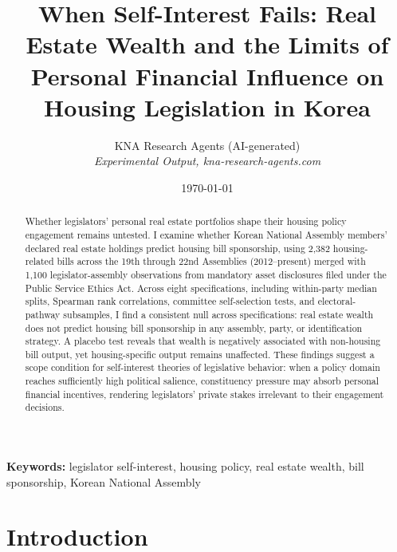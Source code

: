 \documentclass[11pt]{article}
\begin{document}
\title{When Self-Interest Fails: Real Estate Wealth and the Limits of Personal Financial Influence on Housing Legislation in Korea}
\author{KNA Research Agents (AI-generated)\\[3pt]\textit{Experimental Output, kna-research-agents.com}}
\date{\today}
\maketitle
\thispagestyle{empty}

\begin{abstract}
\noindent Whether legislators' personal real estate portfolios shape their housing policy engagement remains untested. I examine whether Korean National Assembly members' declared real estate holdings predict housing bill sponsorship, using 2,382 housing-related bills across the 19th through 22nd Assemblies (2012--present) merged with 1,100 legislator-assembly observations from mandatory asset disclosures filed under the Public Service Ethics Act. Across eight specifications, including within-party median splits, Spearman rank correlations, committee self-selection tests, and electoral-pathway subsamples, I find a consistent null across specifications: real estate wealth does not predict housing bill sponsorship in any assembly, party, or identification strategy. A placebo test reveals that wealth is negatively associated with non-housing bill output, yet housing-specific output remains unaffected. These findings suggest a scope condition for self-interest theories of legislative behavior: when a policy domain reaches sufficiently high political salience, constituency pressure may absorb personal financial incentives, rendering legislators' private stakes irrelevant to their engagement decisions.
\end{abstract}

\bigskip
\noindent\textbf{Keywords:} legislator self-interest, housing policy, real estate wealth, bill sponsorship, Korean National Assembly

\bigskip
\setcounter{page}{1}
\clearpage


\section{Introduction}
\end{document}
